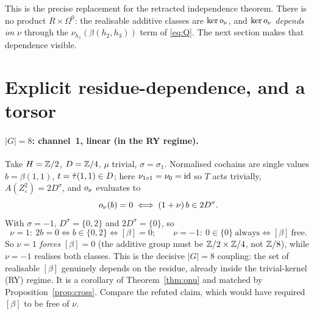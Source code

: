 This is the precise replacement for the retracted independence theorem. There is no
product $R\times\Omega^0$: the realisable additive classes are $\operatorname{ker}o_\nu$, and
$\operatorname{ker}o_\nu$ \emph{depends on $\nu$} through the $\nu_{h_1}(\beta(h_2,h_3))$ term of
\eqref{eq:Q}. The next section makes that dependence visible.

\section{Explicit residue-dependence, and a torsor}\label{sec:omega-coupling}

\paragraph{$|G|=8$: channel~1, linear (in the RY regime).}
Take $H=\mathbb{Z}/2$, $D=\mathbb{Z}/4$, $\mu$ trivial, $\sigma=\sigma_1$. Normalised cochains are
single values $b=\beta(1,1)$, $t=\bar\tau(1,1)\in D$; here $\nu_{1\circ1}=\nu_0=\mathrm{id}$
so $T$ acts trivially, $A(Z^2_\circ)=2D^\sigma$, and $o_\nu$ evaluates to
\[
   o_\nu(b)=0\iff (1+\nu)\,b\in 2D^{\sigma}.
\]
With $\sigma=-1$, $D^\sigma=\{0,2\}$ and $2D^\sigma=\{0\}$, so
\[
   \nu=1:\ 2b=0\iff b\in\{0,2\}\iff[\beta]=0;\qquad
   \nu=-1:\ 0\in\{0\}\ \text{always}\iff[\beta]\ \text{free}.
\]
So $\nu=1$ \emph{forces} $[\beta]=0$ (the additive group must be $\mathbb{Z}/2\times\mathbb{Z}/4$,
not $\mathbb{Z}/8$), while $\nu=-1$ realises both classes. This is the decisive $|G|=8$
coupling: the set of realisable $[\beta]$ genuinely depends on the residue, already
inside the trivial-kernel (RY) regime. It is a corollary of Theorem~\ref{thm:onu}
and matched by Proposition~\ref{prop:cross}. Compare the refuted claim, which
would have required $[\beta]$ to be free of $\nu$.

